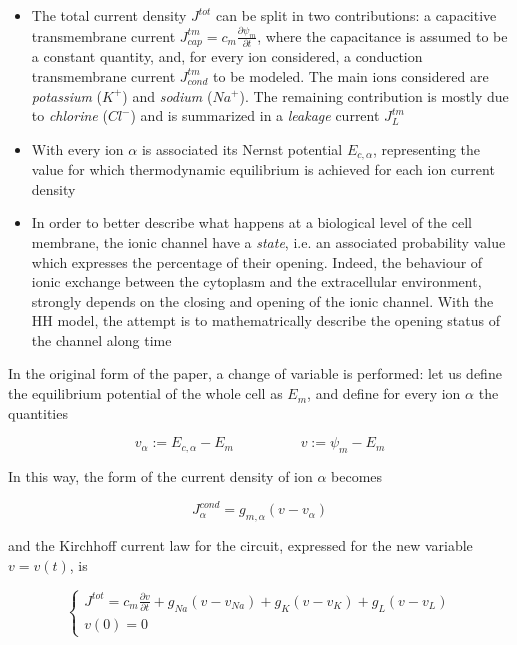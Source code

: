 \documentclass[12pt, a4paper]{report}
\begin{document}
\begin{itemize}
	
	\item The total current density $J^{tot}$ can be split in two contributions: a capacitive transmembrane current $J_{cap}^{tm} = c_m \frac{\partial \psi_m}{\partial t}$, where the capacitance is assumed to be a constant quantity, and, for every ion considered, a conduction transmembrane current  $J_{cond}^{tm}$ to be modeled. The main ions considered are \textit{potassium} ($K^+$) and \textit{sodium} ($Na^+$). The remaining contribution is mostly due to \textit{chlorine} ($Cl^-$) and is summarized in a \textit{leakage} current $J_L^{tm}$
	
	\item With every ion $\alpha$ is associated its Nernst potential $E_{c,\alpha}$, representing the value for which thermodynamic equilibrium is achieved for each ion current density
	
	\item In order to better describe what happens at a biological level of the cell membrane, the ionic channel have a \textit{state}, i.e. an associated probability value which expresses the percentage of their opening. Indeed, the behaviour of ionic exchange between the cytoplasm and the extracellular environment, strongly depends on the closing and opening of the ionic channel. With the HH model, the attempt is to mathematrically describe the opening status of the channel along time
	
	
\end{itemize}	


In the original form of the paper, a change of variable is performed: let us define the equilibrium potential of the whole cell as $E_m$, and define for every ion $\alpha$ the quantities

\begin{equation}
v_\alpha := E_{c,\alpha} - E_m \hspace{2cm}  v := \psi_m - E_m
\end{equation}

In this way, the form of the current density of ion $\alpha$ becomes


\begin{equation}
J_\alpha^{cond} = g_{m,\alpha}(v-v_\alpha)
\end{equation}

and the Kirchhoff current law for the circuit, expressed for the new variable $v = v(t)$, is

\begin{equation}	
\begin{cases}
J^{tot} = \displaystyle c_m \frac{\partial v}{\partial t} + g_{Na}(v - v_{Na}) + g_{K}(v - v_{K}) +g_{L}(v - v_{L})  \\
v(0) = 0
\end{cases}	\end{equation}
\end{document}
